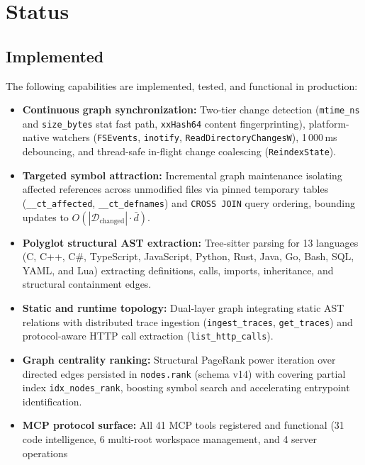 \section{Status}
\label{sec:status}

\subsection{Implemented}

The following capabilities are implemented, tested, and functional in production:

\begin{itemize}
  \item \textbf{Continuous graph synchronization:} Two-tier change detection
        (\texttt{mtime\_ns} and \texttt{size\_bytes} stat fast path, \texttt{xxHash64}
        content fingerprinting), platform-native watchers (\texttt{FSEvents},
        \texttt{inotify}, \texttt{ReadDirectoryChangesW}), 1\,000\,ms debouncing,
        and thread-safe in-flight change coalescing (\texttt{ReindexState}).
  \item \textbf{Targeted symbol attraction:} Incremental graph maintenance
        isolating affected references across unmodified files via pinned temporary
        tables (\texttt{\_\_ct\_affected}, \texttt{\_\_ct\_defnames}) and
        \texttt{CROSS JOIN} query ordering, bounding updates to
        $O(|\mathcal{D}_{\text{changed}}| \cdot \bar{d})$.
  \item \textbf{Polyglot structural AST extraction:} Tree-sitter parsing for
        13 languages (C, C++, C\#, TypeScript, JavaScript, Python, Rust, Java,
        Go, Bash, SQL, YAML, and Lua) extracting definitions, calls, imports,
        inheritance, and structural containment edges.
  \item \textbf{Static and runtime topology:} Dual-layer graph integrating
        static AST relations with distributed trace ingestion (\texttt{ingest\_traces},
        \texttt{get\_traces}) and protocol-aware HTTP call extraction
        (\texttt{list\_http\_calls}).
  \item \textbf{Graph centrality ranking:} Structural PageRank power iteration
        over directed edges persisted in \texttt{nodes.rank} (schema v14) with
        covering partial index \texttt{idx\_\allowbreak nodes\_\allowbreak rank}, boosting symbol search
        and accelerating entrypoint identification.
  \item \textbf{MCP protocol surface:} All 41 MCP tools registered and functional
        (31 code intelligence, 6 multi-root workspace management, and 4 server operations

\end{itemize}
